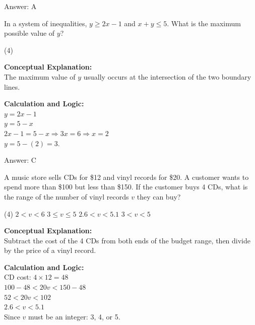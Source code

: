 \documentclass[11pt,paper=a4,answers]{exam}
\begin{document}
\begin{questions}
\begin{solution}
\vspace{15pt}
Answer: \colorbox{yellow!100}{A}
\end{solution}

\vspace{20pt}

\question
In a system of inequalities, $y \ge 2x - 1$ and $x + y \le 5$. What is the maximum possible value of $y$?
\begin{tasks}(4)
\end{tasks}

\begin{solution}
\textbf{Conceptual Explanation:} \\
The maximum value of $y$ usually occurs at the intersection of the two boundary lines.

\vspace{10pt}
\textbf{Calculation and Logic:} \\
$y = 2x - 1$ \\
$y = 5 - x$ \\
$2x - 1 = 5 - x \Rightarrow 3x = 6 \Rightarrow x = 2$ \\
$y = 5 - (2) = 3$.

\vspace{15pt}
Answer: \colorbox{yellow!100}{C}
\end{solution}

\vspace{20pt}

\question
A music store sells CDs for \$12 and vinyl records for \$20. A customer wants to spend more than \$100 but less than \$150. If the customer buys 4 CDs, what is the range of the number of vinyl records $v$ they can buy?
\begin{tasks}(4)
    \task $2 < v < 6$
    \task $3 \le v \le 5$
    \task $2.6 < v < 5.1$
    \task $3 < v < 5$
\end{tasks}

\begin{solution}
\textbf{Conceptual Explanation:} \\
Subtract the cost of the 4 CDs from both ends of the budget range, then divide by the price of a vinyl record.

\vspace{10pt}
\textbf{Calculation and Logic:} \\
CD cost: $4 \times 12 = 48$ \\
$100 - 48 < 20v < 150 - 48$ \\
$52 < 20v < 102$ \\
$2.6 < v < 5.1$ \\
Since $v$ must be an integer: 3, 4, or 5.


\end{solution}
\end{questions}
\end{document}
